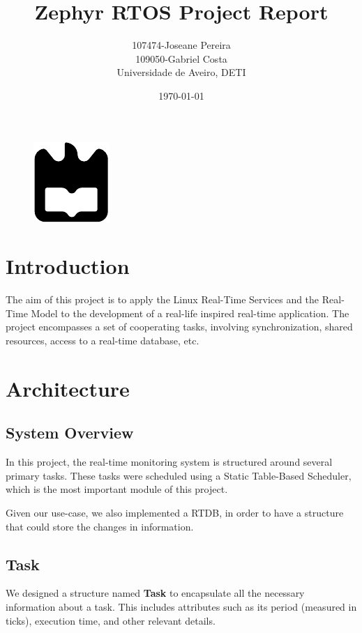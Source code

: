 \documentclass[a4paper,12pt]{article}
\title{Zephyr RTOS Project Report}
\author{
107474-Joseane Pereira \\
109050-Gabriel Costa \\
Universidade de Aveiro, DETI
}
\date{\today}
\begin{document}
\begin{figure}
    \centering
    \includegraphics[width=0.3\linewidth]{ua.pdf}
    \label{fig:enter-label}
\end{figure}
\maketitle
\newpage
\tableofcontents
\newpage

\section{Introduction}
The aim of this project is to apply the Linux Real-Time Services and the Real-Time Model to the development of a real-life inspired real-time application. The project encompasses a set of cooperating tasks, involving synchronization, shared resources, access to a real-time database, etc.

\section{Architecture}
\subsection{System Overview}
In this project, the real-time monitoring system is structured around several primary tasks. These tasks were scheduled using a Static Table-Based Scheduler, which is the most important module of this project. 

Given our use-case, we also implemented a RTDB, in order to have a structure that could store the changes in information.

\subsection{Task}
We designed a structure named \textbf{Task} to encapsulate all the necessary information about a task. This includes attributes such as its period (measured in ticks), execution time, and other relevant details.
\end{document}
